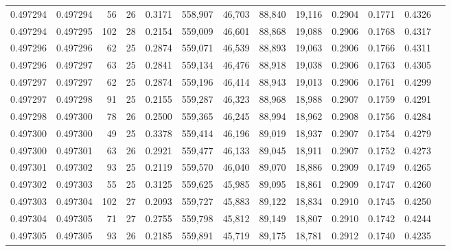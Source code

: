 \begin{tabular}{rrrrrrrrrrrrr}
0.497294 & 0.497294 &  56 &  26 &                                     0.3171 & 558,907 &  46,703 &  88,840 &  19,116 & 0.2904 & 0.1771 & 0.4326 \\
0.497294 & 0.497295 & 102 &  28 &                                     0.2154 & 559,009 &  46,601 &  88,868 &  19,088 & 0.2906 & 0.1768 & 0.4317 \\
0.497296 & 0.497296 &  62 &  25 &                                     0.2874 & 559,071 &  46,539 &  88,893 &  19,063 & 0.2906 & 0.1766 & 0.4311 \\
0.497296 & 0.497297 &  63 &  25 &                                     0.2841 & 559,134 &  46,476 &  88,918 &  19,038 & 0.2906 & 0.1763 & 0.4305 \\
0.497297 & 0.497297 &  62 &  25 &                                     0.2874 & 559,196 &  46,414 &  88,943 &  19,013 & 0.2906 & 0.1761 & 0.4299 \\
0.497297 & 0.497298 &  91 &  25 &                                     0.2155 & 559,287 &  46,323 &  88,968 &  18,988 & 0.2907 & 0.1759 & 0.4291 \\
0.497298 & 0.497300 &  78 &  26 &                                     0.2500 & 559,365 &  46,245 &  88,994 &  18,962 & 0.2908 & 0.1756 & 0.4284 \\
0.497300 & 0.497300 &  49 &  25 &                                     0.3378 & 559,414 &  46,196 &  89,019 &  18,937 & 0.2907 & 0.1754 & 0.4279 \\
0.497300 & 0.497301 &  63 &  26 &                                     0.2921 & 559,477 &  46,133 &  89,045 &  18,911 & 0.2907 & 0.1752 & 0.4273 \\
0.497301 & 0.497302 &  93 &  25 &                                     0.2119 & 559,570 &  46,040 &  89,070 &  18,886 & 0.2909 & 0.1749 & 0.4265 \\
0.497302 & 0.497303 &  55 &  25 &                                     0.3125 & 559,625 &  45,985 &  89,095 &  18,861 & 0.2909 & 0.1747 & 0.4260 \\
0.497303 & 0.497304 & 102 &  27 &                                     0.2093 & 559,727 &  45,883 &  89,122 &  18,834 & 0.2910 & 0.1745 & 0.4250 \\
0.497304 & 0.497305 &  71 &  27 &                                     0.2755 & 559,798 &  45,812 &  89,149 &  18,807 & 0.2910 & 0.1742 & 0.4244 \\
0.497305 & 0.497305 &  93 &  26 &                                     0.2185 & 559,891 &  45,719 &  89,175 &  18,781 & 0.2912 & 0.1740 & 0.4235 \\

\end{tabular}

